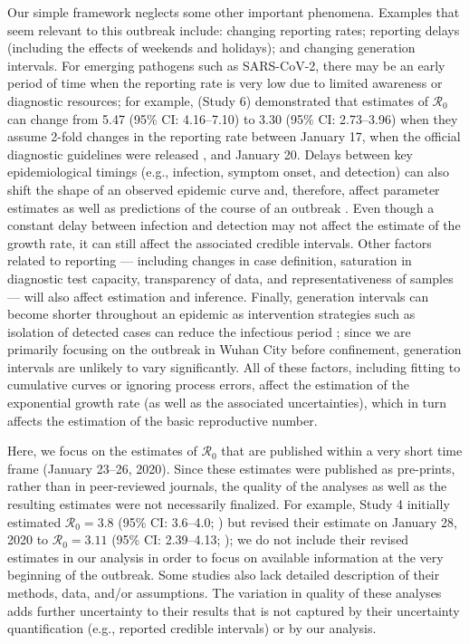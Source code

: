 \documentclass[12pt]{article}
\newcommand{\Ro}{\ensuremath{{\mathcal R}_{0}}\xspace}
\begin{document}
Our simple framework neglects some other important phenomena.
Examples that seem relevant to this outbreak include: changing reporting rates; reporting delays (including the effects of weekends and holidays); and changing generation intervals.
For emerging pathogens such as SARS-CoV-2, there may be an early period of time when the reporting rate is very low due to limited awareness or diagnostic resources;
for example, \cite{zhaoncov} (Study 6) demonstrated that estimates of \Ro can change from 5.47 (95\% CI: 4.16--7.10) to 3.30 (95\% CI: 2.73--3.96) when they assume 2-fold changes in the reporting rate between January 17, when the official diagnostic guidelines were released \citep{who17protocol}, and January 20.
Delays between key epidemiological timings (e.g., infection, symptom onset, and detection) can also shift the shape of an observed epidemic curve and, therefore, affect parameter estimates as well as predictions of the course of an outbreak \citep{tariq2019assessing}.
Even though a constant delay between infection and detection may not affect the estimate of the growth rate, it can still affect the associated credible intervals.
Other factors related to reporting --- including changes in case definition, saturation in diagnostic test capacity, transparency of data, and representativeness of samples --- will also affect estimation and inference.
Finally, generation intervals can become shorter throughout an epidemic as intervention strategies such as isolation of detected cases can reduce the infectious period \citep{hethcote2002effects};
since we are primarily focusing on the outbreak in Wuhan City before confinement, generation intervals are unlikely to vary significantly.
All of these factors, including fitting to cumulative curves or ignoring process errors, affect the estimation of the exponential growth rate (as well as the associated uncertainties), which in turn affects the estimation of the basic reproductive number.

Here, we focus on the estimates of \Ro that are published within a very short time frame (January 23--26, 2020).
Since these estimates were published as pre-prints, rather than in peer-reviewed journals, the quality of the analyses as well as the resulting estimates were not necessarily finalized.
For example, Study 4 initially estimated $\Ro = 3.8$ (95\% CI: 3.6--4.0; \cite{readncov}) but revised their estimate on January 28, 2020 to $\Ro = 3.11$ (95\% CI: 2.39--4.13; \cite{readncov2});
we do not include their revised estimates in our analysis in order to focus on available information at the very beginning of the outbreak.
Some studies also lack detailed description of their methods, data, and/or assumptions.
The variation in quality of these analyses adds further uncertainty to their results that is not captured by their uncertainty quantification (e.g., reported credible intervals) or by our analysis.
\end{document}
